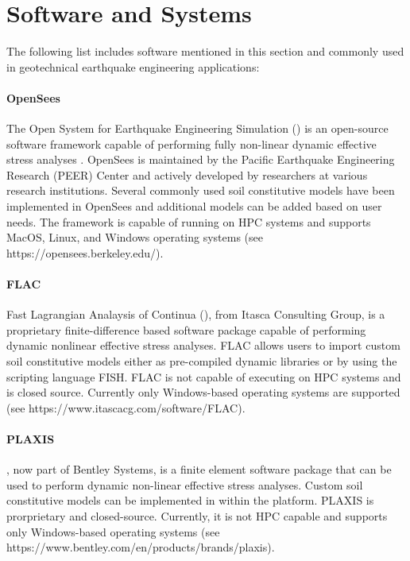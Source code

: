 \section{Software and Systems}
\label{sec:response_geotech_tools}

The following list includes software mentioned in this section and commonly used in geotechnical earthquake engineering applications:

\paragraph{OpenSees}
The Open System for Earthquake Engineering Simulation () is an open-source software framework capable of performing fully non-linear dynamic effective stress analyses \citep{mckenna2011opensees}. OpenSees is maintained by the Pacific Earthquake Engineering Research (PEER) Center and actively developed by researchers at various research institutions. Several commonly used soil constitutive models have been implemented in OpenSees and additional models can be added based on user needs. The framework is capable of running on HPC systems and supports MacOS, Linux, and Windows operating systems (see https://opensees.berkeley.edu/).

\paragraph{FLAC}
Fast Lagrangian Analaysis of Continua (), from Itasca Consulting Group, is a proprietary finite-difference based software package capable of performing dynamic nonlinear effective stress analyses. FLAC allows users to import custom soil constitutive models either as pre-compiled dynamic libraries or by using the scripting language FISH. FLAC is not capable of executing on HPC systems and is closed source. Currently only Windows-based operating systems are supported (see https://www.itascacg.com/software/FLAC).

\paragraph{PLAXIS}
, now part of Bentley Systems, is a finite element software package that can be used to perform dynamic non-linear effective stress analyses. Custom soil constitutive models can be implemented in within the platform. PLAXIS is prorprietary and closed-source. Currently, it is not HPC capable and supports only Windows-based operating systems (see https://www.bentley.com/en/products/brands/plaxis).

